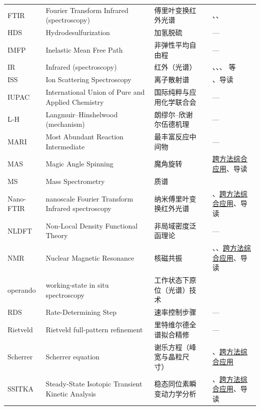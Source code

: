 {\begin{xltabular}{\textwidth}{@{}p{14mm}X p{40mm}p{20mm}p{34mm}@{}}
FTIR & Fourier Transform Infrared (spectroscopy) & 傅里叶变换红外光谱 &  & 、、 \\
HDS & Hydrodesulfurization & 加氢脱硫 &  & — \\
IMFP & Inelastic Mean Free Path & 非弹性平均自由程 &  & — \\
IR & Infrared (spectroscopy) & 红外（光谱） &  & 、、、 等 \\
ISS & Ion Scattering Spectroscopy & 离子散射谱 &  & 、导读 \\
IUPAC & International Union of Pure and Applied Chemistry & 国际纯粹与应用化学联合会 &  & — \\
L-H & Langmuir--Hinshelwood (mechanism) & 朗缪尔--欣谢尔伍德机理 &  & — \\
MARI & Most Abundant Reaction Intermediate & 最丰富反应中间物 &  & — \\
MAS & Magic Angle Spinning & 魔角旋转 &  & \hyperref[ch:13-synthesis]{跨方法综合应用}、导读 \\
MS & Mass Spectrometry & 质谱 &  &  \\
Nano-FTIR & nanoscale Fourier Transform Infrared spectroscopy & 纳米傅里叶变换红外光谱 &  & 、\hyperref[ch:13-synthesis]{跨方法综合应用}、导读 \\
NLDFT & Non-Local Density Functional Theory & 非局域密度泛函理论 &  & — \\
NMR & Nuclear Magnetic Resonance & 核磁共振 &  & 、、\hyperref[ch:13-synthesis]{跨方法综合应用}、导读 \\
operando & working-state in situ spectroscopy & 工作状态下原位（光谱）技术 &  &  \\
RDS & Rate-Determining Step & 速率控制步骤 &  & — \\
Rietveld & Rietveld full-pattern refinement & 里特维尔德全谱拟合精修 &  & — \\
Scherrer & Scherrer equation & 谢乐方程（峰宽与晶粒尺寸） &  & 、\hyperref[ch:13-synthesis]{跨方法综合应用} \\
SSITKA & Steady-State Isotopic Transient Kinetic Analysis & 稳态同位素瞬变动力学分析 &  & 、\hyperref[ch:13-synthesis]{跨方法综合应用}、导读 \\

\end{xltabular}}
